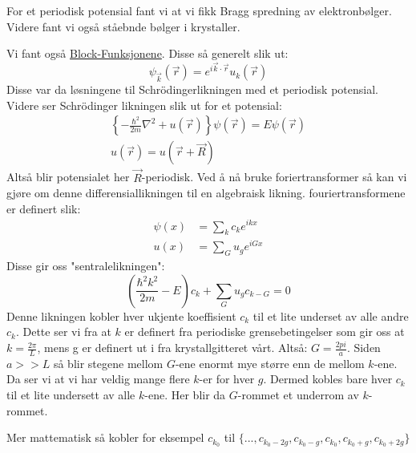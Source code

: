 \documentclass{article}
\begin{document}
For et periodisk potensial fant vi at vi fikk Bragg spredning av elektronbølger. Videre fant vi også ståebnde bølger i krystaller.

Vi fant også \underline{Block-Funksjonene}. Disse så generelt slik ut:
\begin{equation}
  \label{eq:block_funksjoner}
  \psi_{\vec{k}}(\vec{r}) = e^{i\vec{k}\cdot\vec{r}}u_k(\vec{r})
\end{equation}
Disse var da løsningene til Schrödingerlikningen med et periodisk potensial.
Videre ser Schrödinger likningen slik ut for et potensial:
\begin{align}
  \label{eq:schrödinger_likningen_med_periodisk_potensial}
  \left\{  -\frac{\hbar^2}{2m}\nabla^2 + u(\vec{r})  \right\}\psi(\vec{r}) = E\psi(\vec{r}) \\
  u(\vec{r}) = u(\vec{r} + \vec{R})
\end{align}
Altså blir potensialet her $\vec{R}$-periodisk. Ved å nå bruke foriertransformer så kan vi gjøre om denne differensiallikningen til en algebraisk likning. fouriertransformene er definert slik:
\begin{align*}
  \psi(x) &= \sum_k c_k e^{ikx} \\
  u(x) &= \sum_G u_g e^{iGx}
\end{align*}
Disse gir oss "sentralelikningen":
\begin{equation}
  \label{eq:den_sentrale_likningen}
  \left(\frac{\hbar^2 k^2}{2m} - E\right)c_k + \sum_G u_g c_{k-G} = 0
\end{equation}
Denne likningen kobler hver ukjente koeffisient $c_k$ til et lite underset av alle andre $c_k$. Dette ser vi fra at $k$ er definert fra periodiske grensebetingelser som gir oss at $k = \frac{2\pi}{L}$, mens g er definert ut i fra krystallgitteret vårt. Altså: $G = \frac{2pi}{a}$. Siden $a >> L$ så blir stegene mellom $G$-ene enormt mye større enn de mellom $k$-ene. Da ser vi at vi har veldig mange flere $k$-er for hver $g$. Dermed kobles bare hver $c_k$ til et lite undersett av alle $k$-ene. Her blir da $G$-rommet et underrom av $k$-rommet.

Mer mattematisk så kobler for eksempel $c_{k_0}$ til $\{..., c_{k_0 - 2g}, c_{k_0 - g}, c_{k_0}, c_{k_0 + g}, c_{k_0 + 2g}\}$
\end{document}
